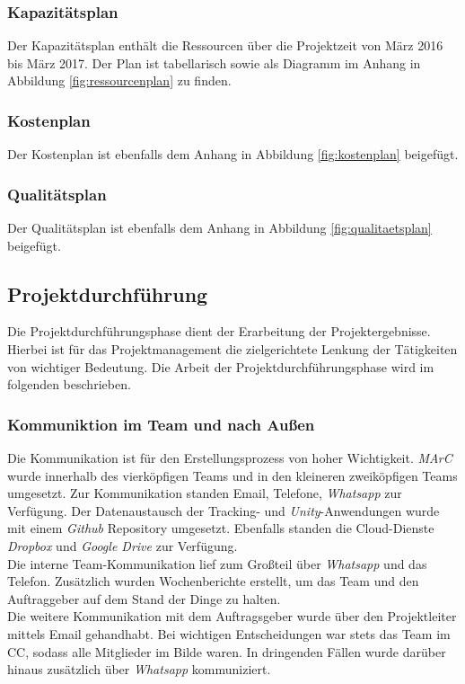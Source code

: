 \subsubsection{Kapazitätsplan}
Der Kapazitätsplan enthält die Ressourcen über die Projektzeit von März 2016 bis März 2017. Der Plan ist tabellarisch sowie als Diagramm im Anhang in Abbildung  \ref{fig:ressourcenplan} zu finden.

\subsubsection{Kostenplan}
Der Kostenplan ist ebenfalls dem Anhang in Abbildung \ref{fig:kostenplan} beigefügt.

\subsubsection{Qualitätsplan}
Der Qualitätsplan ist ebenfalls dem Anhang in Abbildung \ref{fig:qualitaetsplan} beigefügt.

\subsection{Projektdurchführung}
Die Projektdurchführungsphase dient der Erarbeitung der Projektergebnisse. Hierbei ist für das Projektmanagement die zielgerichtete Lenkung der Tätigkeiten von wichtiger Bedeutung. Die Arbeit der Projektdurchführungsphase wird im folgenden beschrieben.
\subsubsection{Kommuniktion im Team und nach Außen}
Die Kommunikation ist für den Erstellungsprozess von hoher Wichtigkeit.\textit{ MArC} wurde innerhalb des vierköpfigen Teams und in den kleineren zweiköpfigen Teams umgesetzt. Zur Kommunikation standen Email, Telefone, \textit{Whatsapp} zur Verfügung. Der Datenaustausch der Tracking- und \textit{Unity}-Anwendungen wurde mit einem \textit{Github} Repository umgesetzt. Ebenfalls standen die Cloud-Dienste \textit{Dropbox} und \textit{Google Drive} zur Verfügung.\\
Die interne Team-Kommunikation lief zum Großteil über \textit{Whatsapp} und das Telefon. Zusätzlich wurden Wochenberichte erstellt, um das Team und den Auftraggeber auf dem Stand der Dinge zu halten.\\
Die weitere Kommunikation mit dem Auftragsgeber wurde über den Projektleiter mittels Email gehandhabt. Bei wichtigen Entscheidungen war stets das Team im CC, sodass alle Mitglieder im Bilde waren. In dringenden Fällen wurde darüber hinaus zusätzlich über \textit{Whatsapp} kommuniziert.

